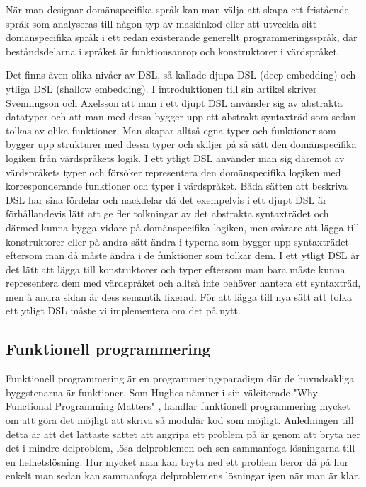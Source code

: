 \documentclass[]{article}
\begin{document}
När man designar domänspecifika språk kan man välja att skapa ett fristående
språk som analyseras till någon typ av maskinkod eller att utveckla sitt
domänspecifika språk i ett redan existerande generellt programmeringsspråk,
där beståndsdelarna i språket är funktionsanrop och konstruktorer i värdspråket.

Det finns även olika nivåer av DSL, så kallade djupa DSL (deep embedding) och
ytliga DSL (shallow embedding). I introduktionen till sin artikel skriver
Svenningson och Axelsson \cite{Svenningsson2013} att man i ett djupt
DSL använder sig av abstrakta datatyper och att man med dessa bygger upp ett
abstrakt syntaxträd som sedan tolkas av olika funktioner.
Man skapar alltså egna typer och funktioner som bygger upp strukturer med dessa
typer och skiljer på så sätt den domänspecifika logiken från värdspråkets logik.
I ett ytligt DSL använder man sig däremot av värdspråkets typer och försöker
representera den domänspecifika logiken med korresponderande funktioner och
typer i värdspråket.
Båda sätten att beskriva DSL har sina fördelar och nackdelar då det exempelvis
i ett djupt DSL är förhållandevis lätt att ge fler tolkningar av det abstrakta
syntaxträdet och därmed kunna bygga vidare på domänspecifika logiken,
men svårare att lägga till konstruktorer eller på andra sätt ändra i typerna som
bygger upp syntaxträdet eftersom man då måste ändra i de funktioner som tolkar
dem. I ett ytligt DSL är det lätt att lägga till konstruktorer och typer
eftersom man bara måste kunna representera dem med värdspråket och alltså inte
behöver hantera ett syntaxträd, men å andra sidan är dess semantik fixerad.
För att lägga till nya sätt att tolka ett ytligt DSL måste vi implementera
om det på nytt.

\subsection{Funktionell programmering}
Funktionell programmering är en programmeringsparadigm där de huvudsakliga
byggstenarna är funktioner.
Som Hughes nämner i sin välciterade "Why Functional Programming Matters"
\cite{hughes1989functional}, handlar funktionell programmering mycket om att göra det
möjligt att skriva så modulär kod som möjligt.
Anledningen till detta är att det lättaste sättet att angripa ett problem på är
genom att bryta ner det i mindre delproblem, lösa delproblemen och sen
sammanfoga lösningarna till en helhetslösning.
Hur mycket man kan bryta ned ett problem beror då på hur enkelt man sedan kan
sammanfoga delproblemens lösningar igen när man är klar.
\end{document}
